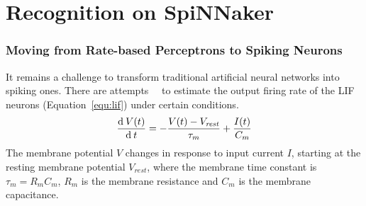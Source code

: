 \chapter{Recognition on SpiNNaker}
\label{cha:rsp}

\subsection{Moving from Rate-based Perceptrons to Spiking Neurons}
It remains a challenge to transform traditional artificial neural networks into spiking ones.
There are attempts~\cite{la2008response}~\cite{burkitt2006review} to estimate the output firing rate of the LIF neurons (Equation~\ref{equ:lif}) under certain conditions. 
\begin{equation}
\frac{\mathrm{d} \: V(t)}{\mathrm{d}\:  t}=-\frac{V(t)-V_\mathit{rest}}{\tau_m}+\frac{I(t)}{C_m}
\label{equ:lif}
\end{equation}
The membrane potential $V$ changes in response to input current $I$, starting at the resting membrane potential  $V_{rest}$, where the membrane time constant is $\tau_m = R_mC_m$, $R_m$ is the membrane resistance and $C_m$ is the membrane capacitance.

